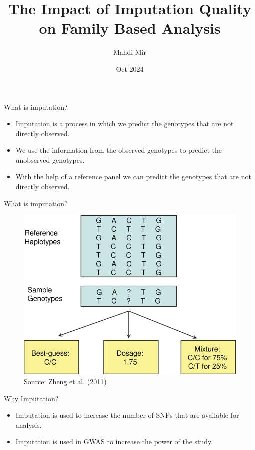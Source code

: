 \documentclass{beamer}
\title[]{The Impact of Imputation Quality on Family Based Analysis}
\author[]{Mahdi Mir}
\institute[]{SSGAC}
\date[]{Oct 2024}
\begin{document}
\maketitle


\begin{frame}{What is imputation?}
      \begin{itemize}
            \item Imputation is a process in which we predict the genotypes that are not directly observed.
            \item We use the information from the observed genotypes to predict the unobserved genotypes.
            \item With the help of a reference panel we can predict the genotypes that are not directly observed.
      \end{itemize}
\end{frame}

\begin{frame}{What is imputation?}
      \begin{figure}
            \centering
            \includegraphics[width= .7\textwidth]{fig/mfig001-2.jpg}
            \caption{Source: Zheng et al. (2011)}
      \end{figure}
\end{frame}

\begin{frame}{Why Imputation?}
      \begin{itemize}
            \item Imputation is used to increase the number of SNPs that are available for analysis.
            \item Imputation is used in GWAS to increase the power of the study.
      \end{itemize}
\end{frame}
\end{document}
